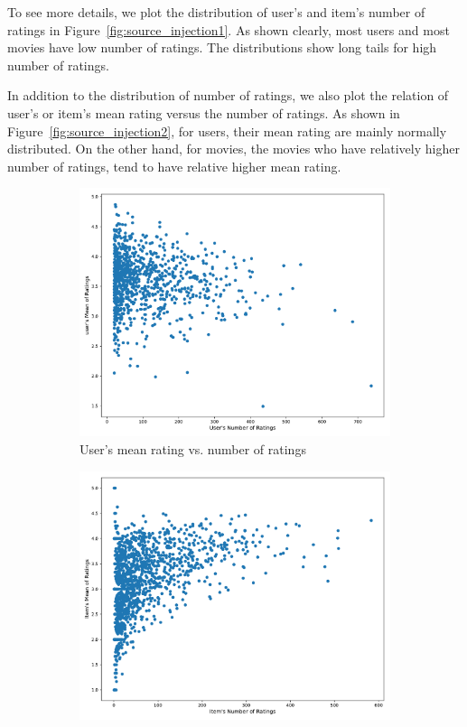 \newpage
To see more details, we plot the distribution of user's and item's number of ratings in Figure~\ref{fig:source_injection1}. As shown clearly, most users and most movies have low number of ratings. The distributions show long tails for high number of ratings.

In addition to the distribution of number of ratings, we also plot the relation of user's or item's mean rating versus the number of ratings. As shown in Figure~\ref{fig:source_injection2}, for users, their mean rating are mainly normally distributed. On the other hand, for movies, the movies who have relatively higher number of ratings, tend to have relative higher mean rating.

\begin{figure}[!h]
\centering
\begin{subfigure}[b]{0.5\linewidth}
  \includegraphics[width=1.00\textwidth]{./figures/user_mean_rating.pdf}
  \caption{User's mean rating vs. number of ratings}
   \label{ex_without_source}
\end{subfigure}%
\begin{subfigure}[b]{0.5\linewidth}
  \centering
  \includegraphics[width=1.00\textwidth]{./figures/item_mean_rating.pdf}

\end{subfigure}
\end{figure}
